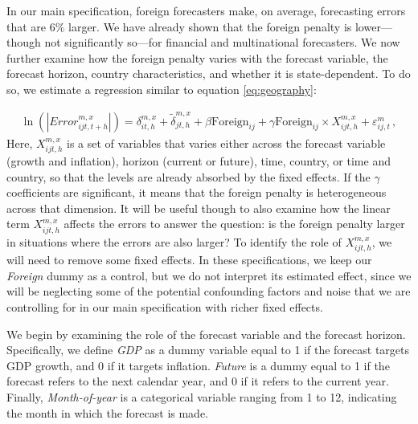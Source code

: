 
In our main specification, foreign forecasters make, on average, forecasting errors that are 6\% larger. We have already shown that the foreign penalty is lower—though not significantly so—for financial and multinational forecasters. We now further examine how the foreign penalty varies with the forecast variable, the forecast horizon, country characteristics, and whether it is state-dependent. To do so, we estimate a regression similar to equation \eqref{eq:geography}:

\begin{align}
	\ln(|Error_{ijt,t+h}^{m,x}|)= \delta_{it,h}^{m,x} +\tilde\delta_{jt,h}^{m,x} +  \beta \text{Foreign}_{ij} +\gamma \text{Foreign}_{ij}\times X_{ijt,h}^{m,x}+ \varepsilon_{ij,t}^m  \,, \label{eq:heterogeneity}
\end{align}
Here, $X_{ijt,h}^{m,x}$ is a set of variables that varies either across the forecast variable (growth and inflation), horizon (current or future), time, country, or time and country, so that the levels are already absorbed by the fixed effects. If the $\gamma$ coefficients are significant, it means that the foreign penalty is heterogeneous across that dimension. It will be useful though to also examine how the linear term $X_{ijt,h}^{m,x}$ affects the errors to answer the question: is the foreign penalty larger in situations where the errors are also larger? To identify the role of $X_{ijt,h}^{m,x}$, we will need to remove some fixed effects. In these specifications, we keep our \textit{Foreign} dummy as a control, but we do not interpret its estimated effect, since we will be neglecting some of the potential confounding factors and noise that we are controlling for in our main specification with richer fixed effects.

We begin by examining the role of the forecast variable and the forecast horizon. Specifically, we define \textit{GDP} as a dummy variable equal to 1 if the forecast targets GDP growth, and 0 if it targets inflation. \textit{Future} is a dummy equal to 1 if the forecast refers to the next calendar year, and 0 if it refers to the current year. Finally, \textit{Month-of-year} is a categorical variable ranging from 1 to 12, indicating the month in which the forecast is made.


